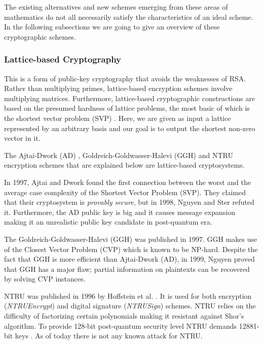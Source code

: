 \documentclass[conference, letterpaper]{IEEEtran}
\begin{document}
The existing alternatives and new schemes emerging from these areas of mathematics do not all necessarily satisfy the characteristics of an ideal scheme. In the following subsections we are going to give an overview of these cryptographic schemes.

\subsubsection{Lattice-based Cryptography}
This is a form of public-key cryptography that avoids the weaknesses of RSA. Rather than multiplying primes, lattice-based encryption schemes involve multiplying matrices. Furthermore, lattice-based cryptographic constructions are based on the presumed hardness of lattice problems, the most basic of which is the shortest vector problem (SVP) \cite{Micciancio2009}. Here, we are given as input a lattice represented by an arbitrary basis and our goal is to output the shortest non-zero vector in it.

The Ajtai-Dwork (AD) \cite{Ajtai1997}, Goldreich-Goldwasser-Halevi (GGH) \cite{Goldreich1997} and NTRU \cite{Hoffstein1998} encryption schemes that are explained below are lattice-based cryptosystems.

In 1997, Ajtai and Dwork\cite{Ajtai1997} found the first connection between the worst and the average case complexity of the Shortest Vector Problem (SVP). They claimed that their cryptosystem is \textit{provably secure}, but in 1998, Nguyen and Ster \cite{Nguyen1998} refuted it. Furthermore, the AD public key is big and it causes message expansion making it an unrealistic public key candidate in post-quantum era. 

The Goldreich-Goldwasser-Halevi (GGH) was published in 1997. GGH makes use of the Closest Vector Problem (CVP) which is known to be NP-hard. Despite the fact that GGH is more efficient than Ajtai-Dwork (AD), in 1999, Nguyen\cite{Nguyen1999} proved that GGH has a major flaw; partial information on plaintexts can be recovered by solving CVP instances.

NTRU was published in 1996 by Hoffstein et al. \cite{Hoffstein1998}. It is used for both encryption (\textit{NTRUEncrypt}) and digital signature (\textit{NTRUSign}) schemes. NTRU relies on the difficulty of factorizing certain polynomials making it resistant against Shor's algorithm. To provide 128-bit post-quantum security level NTRU demands 12881-bit keys \cite{Hoffstein}. As of today there is not any known attack for NTRU.
\end{document}
